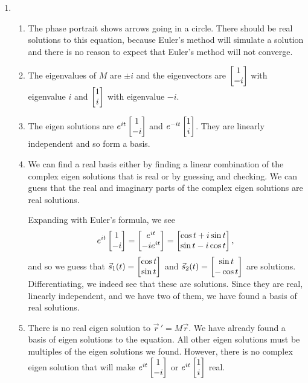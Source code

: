 \begin{enumerate}
		\item
		\begin{enumerate}
			\item The phase portrait shows arrows going in a circle. There should be real solutions to this equation,
			because Euler's method will simulate a solution and there is no reason to expect that Euler's method will
			not converge.
			\item The eigenvalues of $M$ are $\pm i$ and the eigenvectors are $\begin{bmatrix}1\\-i\end{bmatrix}$ with eigenvalue $i$ and $\begin{bmatrix}1\\i\end{bmatrix}$
			with eigenvalue $-i$.
			\item The eigen solutions are $e^{it}\begin{bmatrix}1\\-i\end{bmatrix}$ and $e^{-it}\begin{bmatrix}1\\i\end{bmatrix}$. They are linearly independent and so form a basis.
			\item We can find a real basis either by finding a linear combination of the complex eigen solutions that is real or by 
			guessing and checking. We can guess that the real and imaginary parts of the complex eigen solutions are real solutions.
			
			Expanding with Euler's formula, we see
			\[
				e^{it}\begin{bmatrix}1\\-i\end{bmatrix}=\begin{bmatrix}e^{it}\\-ie^{it}\end{bmatrix}=\begin{bmatrix}\cos t+i\sin t\\\sin t-i\cos t\end{bmatrix},
			\]
			and so we guess that $\vec s_1(t) = \begin{bmatrix}\cos t\\\sin t\end{bmatrix}$ and $\vec s_2(t)=\begin{bmatrix}\sin t\\-\cos t\end{bmatrix}$ are solutions. Differentiating,
			we indeed see that these are solutions. Since they are real, linearly independent, and we have two of them, we have found a basis
			of real solutions.
			\item There is no real eigen solution to $\vec r\,'=M\vec r$. We have already found a basis of eigen solutions to the equation.
			All other eigen solutions must be multiples of the eigen solutions we found. However, there is no complex eigen solution that will
			make $e^{it}\begin{bmatrix}1\\-i\end{bmatrix}$ or $e^{it}\begin{bmatrix}1\\i\end{bmatrix}$ real.
		\end{enumerate}

\end{enumerate}